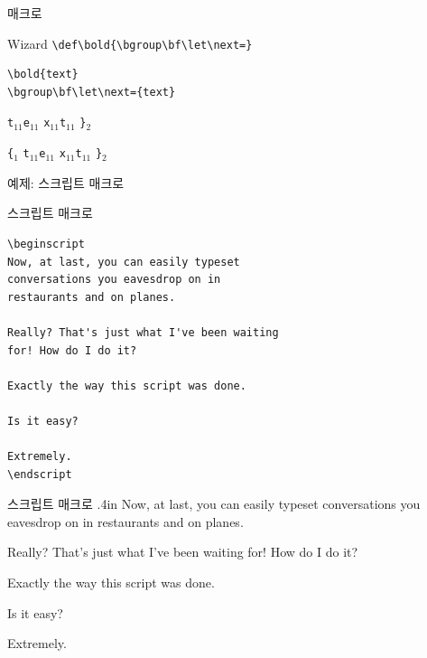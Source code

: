\documentclass{beamer}
\begin{document}
%
\begin{frame}[fragile]{\texttt{\string\bold} 매크로}
  \begin{alertblock}{Wizard}
    \verb+\def\bold{\bgroup\bf\let\next=}+
  \end{alertblock}

  \begin{Verbatim}[fontsize=\small, formatcom=\color{blue}]
\bold{text}
\bgroup\bf\let\next={text}
  \end{Verbatim}

  \bigskip

  \quad{}\quad
  \verb|t|$_{11}$\quad\verb|e|$_{11}$\quad
  \verb|x|$_{11}$\quad\verb|t|$_{11}$\quad
  \verb|}|$_{2}$

  \verb|{|$_1$\quad{}\quad
  \verb|t|$_{11}$\quad\verb|e|$_{11}$\quad
  \verb|x|$_{11}$\quad\verb|t|$_{11}$\quad
  \verb|}|$_{2}$
\end{frame}


%
\begin{frame}[standout]
  예제: 스크립트 매크로
\end{frame}


%
\begin{frame}[fragile]{스크립트 매크로}
  \begin{Verbatim}[fontsize=\small]
\beginscript
Now, at last, you can easily typeset
conversations you eavesdrop on in
restaurants and on planes.
  
Really? That's just what I've been waiting
for! How do I do it?
  
Exactly the way this script was done.
  
Is it easy?
  
Extremely.
\endscript
  \end{Verbatim}
\end{frame}


%
\newcount\spk
\def\beginscript{\bgroup \parindent=0pt \color{red} \spk=1 \rightskip.4in
  \def\par{\ifnum\spk=1 \endgraf \color{blue} \spk=2 \leftskip.4in
    \rightskip0in
    \else \endgraf \color{red} \spk=1 \leftskip0in \rightskip.4in \fi}}
\def\endscript {\egroup}

\begin{frame}[fragile]{스크립트 매크로}
  \hsize 3in
  \beginscript
  Now, at last, you can easily typeset
  conversations you eavesdrop on in
  restaurants and on planes.
  
  Really? That's just what I've been waiting
  for! How do I do it?
  
  Exactly the way this script was done.
  
  Is it easy?
  
  Extremely.
  \endscript
\end{frame}
\end{document}
